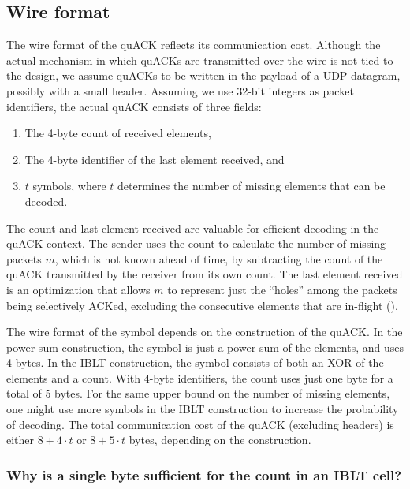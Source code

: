 \subsection{Wire format}
\label{sec:quack:implementation:wire-format}

The wire format of the quACK reflects its communication cost.
Although the actual mechanism in which quACKs are transmitted over
the wire is not tied to the design, we assume quACKs to be written in the
payload of a UDP datagram, possibly with a small header. Assuming we use 32-bit
integers as packet identifiers, the actual quACK consists of three fields:

\begin{enumerate}[label=(\roman*),noitemsep]
\item The 4-byte count of received elements,
\item The 4-byte identifier of the last element received, and
\item $t$ symbols, where $t$ determines the number of missing elements that can
 be decoded.
\end{enumerate}

The count and last element received are valuable for efficient decoding in the
quACK context. The sender uses the count to calculate the number of missing
packets $m$, which is not known ahead of time, by subtracting the count of the
quACK transmitted by the receiver from its own count. The last element received
is an optimization that allows $m$ to represent just the ``holes'' among the
packets being selectively ACKed, excluding the consecutive elements that are
in-flight ().

The wire format of the symbol depends on the construction of the quACK. In the
power sum construction, the symbol is just a power sum of the elements, and
uses 4 bytes. In the IBLT construction, the symbol consists of both an XOR of
the elements and a count. With 4-byte identifiers, the count uses just one byte
for a total of 5 bytes. For the same upper bound on the number of missing
elements, one might use more symbols in the IBLT construction to increase the
probability of decoding. The total communication cost of the quACK (excluding
headers) is either $8+4\cdot t$ or $8+5\cdot t$ bytes, depending on the
construction.

\subsubsection{Why is a single byte sufficient for the count in an IBLT cell?}


